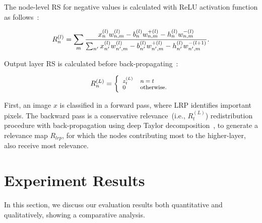 \documentclass[conference]{IEEEtran}
\begin{document}
The node-level RS for negative values is calculated with ReLU activation function as follows~\cite{LRP2}:

\vspace{-2mm}
\begin{equation}
\scriptsize{
    R_{n}^{(l)}=\sum_{m} \frac{x_{n}^{(l)} w_{n, m}^{(l)}-b_{n}^{(l)} w_{n, m}^{+(l)}-h_{n}^{(l)} w_{n, m}^{-(l)}}{\sum_{n^{\prime}} x_{n^{\prime}}^{(l)} w_{n^{\prime}, m}^{(l)}-b_{n^{\prime}}^{(l)} w_{n^{\prime}, m}^{+(l)}-h_{n^{\prime}}^{(l)} w_{n^{\prime}, m}^{-(l+1)}}.}
\end{equation}
\vspace{-2mm}

\noindent Output layer RS is calculated before  back-propagating~\cite{LRP2}:

\vspace{-2mm}
\begin{equation}
\scriptsize{
    R_{n}^{(L)}=\left\{\begin{array}{ll}
    {z_{t}^{(L)}} & {n=t} \\
    {0} & {\text {otherwise.}}
    \end{array}\right.}
\end{equation}
\vspace{-2mm}

First, an image $x$ is classified in a forward pass, where LRP identifies important pixels. The backward pass is a conservative relevance~(i.e., $R_{t}^{(L)}$) redistribution procedure with back-propagation using deep Taylor decomposition~\cite{DTD}, to generate a relevance map $R_{lrp}$, for which the nodes contributing most to the higher-layer, also receive most relevance. 
\fi 

\section{Experiment Results}
\label{sec:er}
In this section, we discuss our evaluation results both quantitative and qualitatively, showing a comparative analysis. 
\end{document}
